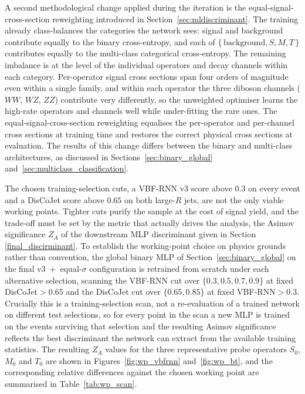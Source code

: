 A second methodological change applied during the iteration is the equal-signal-cross-section reweighting introduced in Section~\ref{sec:mldiscriminant}. The training already class-balances the categories the network sees: signal and background contribute equally to the binary cross-entropy, and each of $\{\,\mathrm{background},S,M,T\,\}$ contributes equally to the multi-class categorical cross-entropy. The remaining imbalance is at the level of the individual operators and decay channels within each category. Per-operator signal cross sections span four orders of magnitude even within a single family, and within each operator the three diboson channels ($WW$, $WZ$, $ZZ$) contribute very differently, so the unweighted optimiser learns the high-rate operators and channels well while under-fitting the rare ones. The equal-signal-cross-section reweighting equalises the per-operator and per-channel cross sections at training time and restores the correct physical cross sections at evaluation. The results of this change differs between the binary and multi-class architectures, as discussed in Sections~\ref{sec:binary_global} and~\ref{sec:multiclass_classification}.

The chosen training-selection cuts, a VBF-RNN v3 score above $0.3$ on every event and a DisCoJet score above $0.65$ on both large-$R$ jets, are not the only viable working points. Tighter cuts purify the sample at the cost of signal yield, and the trade-off must be set by the metric that actually drives the analysis, the Asimov significance $Z_A$ of the downstream MLP discriminant given in Section \ref{final_discirminant}. To establish the working-point choice on physics grounds rather than convention, the global binary MLP of Section~\ref{sec:binary_global} on the final v3~+~equal-$\sigma$ configuration is retrained from scratch under each alternative selection, scanning the VBF-RNN cut over $\{0.3,0.5,0.7,0.9\}$ at fixed DisCoJet${}>0.65$ and the DisCoJet cut over $\{0.65,0.85\}$ at fixed VBF-RNN${}>0.3$. Crucially this is a training-selection scan, not a re-evaluation of a trained network on different test selections, so for every point in the scan a new MLP is trained on the events surviving that selection and the resulting Asimov significance reflects the best discriminant the network can extract from the available training statistics. The resulting $Z_A$ values for the three representative probe operators $S_0$, $M_0$ and $T_0$ are shown in Figures~\ref{fig:wp_vbfrnn} and~\ref{fig:wp_bt}, and the corresponding relative differences against the chosen working point are summarised in Table~\ref{tab:wp_scan}.

